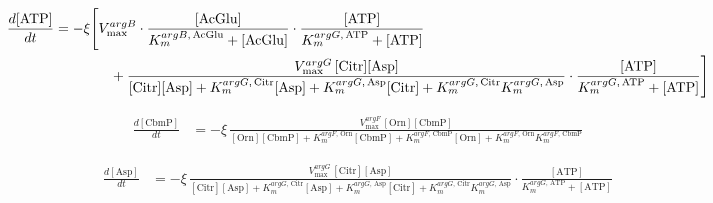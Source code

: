 \begin{align}
\frac{d[\mathrm{ATP}]}{dt}
  &= -\xi \Biggl[
      V_{\max}^{argB}
      \cdot\frac{[\mathrm{AcGlu}]}{K_m^{argB,\,\mathrm{AcGlu}}+[\mathrm{AcGlu}]}
      \cdot\frac{[\mathrm{ATP}]}{K_m^{argG,\,\mathrm{ATP}}+[\mathrm{ATP}]}
  \notag\\
  &\qquad\qquad +
      \frac{V_{\max}^{argG}\,[\mathrm{Citr}][\mathrm{Asp}]}
           {[\mathrm{Citr}][\mathrm{Asp}]
            +K_m^{argG,\,\mathrm{Citr}}[\mathrm{Asp}]
            +K_m^{argG,\,\mathrm{Asp}}[\mathrm{Citr}]
            +K_m^{argG,\,\mathrm{Citr}}K_m^{argG,\,\mathrm{Asp}}}
      \cdot\frac{[\mathrm{ATP}]}{K_m^{argG,\,\mathrm{ATP}}+[\mathrm{ATP}]}
    \Biggr]
\label{eq:dATP}
\end{align}

\begin{align}
\frac{d[\mathrm{CbmP}]}{dt}
  &= -\xi\,
      \frac{V_{\max}^{argF}\,[\mathrm{Orn}][\mathrm{CbmP}]}
           {[\mathrm{Orn}][\mathrm{CbmP}]
            +K_m^{argF,\,\mathrm{Orn}}[\mathrm{CbmP}]
            +K_m^{argF,\,\mathrm{CbmP}}[\mathrm{Orn}]
            +K_m^{argF,\,\mathrm{Orn}}K_m^{argF,\,\mathrm{CbmP}}}
\label{eq:dCbmP}
\end{align}

\begin{align}
\frac{d[\mathrm{Asp}]}{dt}
  &= -\xi\,
      \frac{V_{\max}^{argG}\,[\mathrm{Citr}][\mathrm{Asp}]}
           {[\mathrm{Citr}][\mathrm{Asp}]
            +K_m^{argG,\,\mathrm{Citr}}[\mathrm{Asp}]
            +K_m^{argG,\,\mathrm{Asp}}[\mathrm{Citr}]
            +K_m^{argG,\,\mathrm{Citr}}K_m^{argG,\,\mathrm{Asp}}}
      \cdot\frac{[\mathrm{ATP}]}{K_m^{argG,\,\mathrm{ATP}}+[\mathrm{ATP}]}
\label{eq:dAsp}
\end{align}
